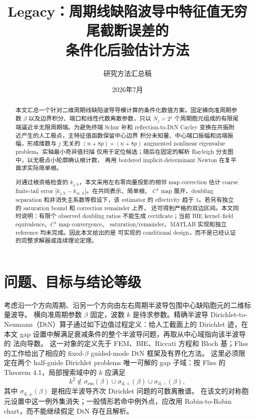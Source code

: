 \documentclass[UTF8,fontset=fandol,11pt,a4paper]{ctexart}
\title{Legacy：周期线缺陷波导中特征值无穷尾截断误差的\\条件化后验估计方法}
\author{研究方法汇总稿}
\date{2026年7月}
\begin{document}
\maketitle

\begin{center}
\end{center}

\begin{abstract}
本文汇总一个针对二维周期线缺陷波导导模计算的条件化数值方案。固定横向准周期参数
$\beta$ 以及边界积分、端口和线性代数离散参数，只以
$N_j=2^j$ 个周期胞元组成的有限尾端逼近半无限周期端。为避免终端 Schur 补和
reflection-to-DtN Cayley 变换在共振附近产生的人工极点，主特征值函数保留中心边界
积分未知量、中心端口振幅和远端振幅，形成维数与 $j$ 无关的
$(n+8p)\times(n+8p)$ augmented nonlinear eigenvalue problem。实轴最小奇异值扫描
仅用于定位候选；随后在固定的解析 Rayleigh 分支图中，以无极点小轮廓确认根计数，
再用 bordered implicit-determinant Newton 在复平面求实际简单根。

对通过根资格检查的 $k_{j,h}$，本文采用左右零向量投影的相邻 map correction
估计 coarse finite-tail error $|k_{j,h}-k_{\infty,h}|$。在共同表示、简单根、
$C^1$ map 展开、doubling separation 和非消失主系数等假设下，该 estimator 的
effectivity 趋于 $1$。若另有独立的 saturation bound 和 correction remainder 上界，
还可得到严格的双边区间。本文同时说明：有限个 observed doubling ratios 不能生成
certificate；当前 BIE kernel--field equivalence、$C^1$ map convergence、
saturation/remainder、MATLAB 实现和独立 reference 均未完成。因此本文给出的是
可实现的 conditional design，而不是已经认证的完整求解器或连续理论定理。
\end{abstract}

\section{问题、目标与结论等级}

考虑沿一个方向周期、沿另一个方向由左右周期半波导包围中心缺陷胞元的二维标量波导。
横向准周期参数 $\beta$ 固定，波数 $k$ 是待求参数。精确半波导
Dirichlet-to-Neumann（DtN）算子通过如下边值过程定义：给人工截面上的 Dirichlet
迹，在本文 gap 设置中解满足衰减条件的整个半波导问题，再取从中心域指向该半波导的
法向导数。
这一对象的定义先于 FEM、BIE、Riccati 方程和 Bloch 基；Fliss 的工作给出了相应的
fixed-$\beta$ guided-mode DtN 框架及有界化方法\cite{Fliss2013}。
这里必须限定在两个 half-guide Dirichlet problems 唯一可解的 gap 子域：按 Fliss 的
Theorem 4.1，局部搜索域中的 $k$ 应满足
\[
  k^2\notin \sigma_{\mathrm{ess}}(\beta)
  \cup\sigma_{\mathrm{d},+}(\beta)
  \cup\sigma_{\mathrm{d},-}(\beta),
\]
其中 $\sigma_{\mathrm{d},\pm}(\beta)$ 是相应半波导齐次 Dirichlet 问题的可数离散谱。
在该文的对称胞元设置中这一例外集消失；一般情形若命中例外点，应改用
Robin-to-Robin chart，而不能继续假定 DtN 存在且解析。
\end{document}
